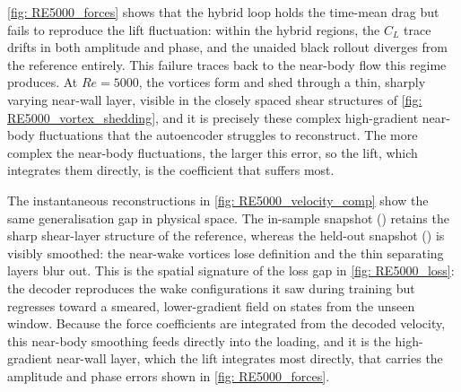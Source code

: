 \autoref{fig: RE5000_forces} shows that the hybrid loop holds the time-mean drag but fails to reproduce the lift fluctuation: within the hybrid regions, the $C_L$ trace drifts in both amplitude and phase, and the unaided black rollout diverges from the reference entirely. This failure traces back to the near-body flow this regime produces. At $Re=5000$, the vortices form and shed through a thin, sharply varying near-wall layer, visible in the closely spaced shear structures of \autoref{fig: RE5000_vortex_shedding}, and it is precisely these complex high-gradient near-body fluctuations that the autoencoder struggles to reconstruct. The more complex the near-body fluctuations, the larger this error, so the lift, which integrates them directly, is the coefficient that suffers most.


The instantaneous reconstructions in \autoref{fig: RE5000_velocity_comp} show the same generalisation gap in physical space. The in-sample snapshot () retains the sharp shear-layer structure of the reference, whereas the held-out snapshot () is visibly smoothed: the near-wake vortices lose definition and the thin separating layers blur out. This is the spatial signature of the loss gap in \autoref{fig: RE5000_loss}: the decoder reproduces the wake configurations it saw during training but regresses toward a smeared, lower-gradient field on states from the unseen window. Because the force coefficients are integrated from the decoded velocity, this near-body smoothing feeds directly into the loading, and it is the high-gradient near-wall layer, which the lift integrates most directly, that carries the amplitude and phase errors shown in \autoref{fig: RE5000_forces}.



